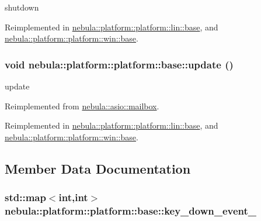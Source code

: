 shutdown 

Reimplemented in \hyperlink{classnebula_1_1platform_1_1platform_1_1lin_1_1base_a524f2d600ae0297bab511783657b33b0}{nebula::platform::platform::lin::base}, and \hyperlink{classnebula_1_1platform_1_1platform_1_1win_1_1base_ab01580e3a7d8e146512d5a23fb5c9bb1}{nebula::platform::platform::win::base}.\hypertarget{classnebula_1_1platform_1_1platform_1_1base_a9036fffff86ce314d44ab292291088c9}{
\subsubsection[{update}]{\setlength{\rightskip}{0pt plus 5cm}void nebula::platform::platform::base::update ()}}
\label{classnebula_1_1platform_1_1platform_1_1base_a9036fffff86ce314d44ab292291088c9}


update 

Reimplemented from \hyperlink{classnebula_1_1asio_1_1mailbox_afee466b6e97ee4116768479dd8337d98}{nebula::asio::mailbox}.

Reimplemented in \hyperlink{classnebula_1_1platform_1_1platform_1_1lin_1_1base_a2c85fc5372d292e5c79df69d07aefcd1}{nebula::platform::platform::lin::base}, and \hyperlink{classnebula_1_1platform_1_1platform_1_1win_1_1base_a89720e3bc6dee8af7f77469c8693596e}{nebula::platform::platform::win::base}.

\subsection{Member Data Documentation}
\hypertarget{classnebula_1_1platform_1_1platform_1_1base_a26b2e3a38e35687673293a0c72cf821f}{
\subsubsection[{key\_\-down\_\-event\_\-}]{\setlength{\rightskip}{0pt plus 5cm}std::map$<$int,int$>$ {\bf nebula::platform::platform::base::key\_\-down\_\-event\_\-}}}
\label{classnebula_1_1platform_1_1platform_1_1base_a26b2e3a38e35687673293a0c72cf821f}


